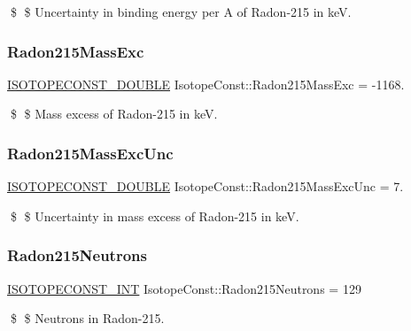 \$ \$ Uncertainty in binding energy per A of Radon-\/215 in keV. \mbox{\label{group___isotope_const-_radon-_rn215_gae24ec0d38185779985fa2596e9b9adc6}} 
\subsubsection{\texorpdfstring{Radon215\+Mass\+Exc}{Radon215MassExc}}
{\footnotesize\ttfamily \mbox{\hyperlink{group___isotope_const-_macros_ga8f45a7272ce02c0b4c65c44636ed719a}{I\+S\+O\+T\+O\+P\+E\+C\+O\+N\+S\+T\+\_\+\+D\+O\+U\+B\+LE}} Isotope\+Const\+::\+Radon215\+Mass\+Exc = -\/1168.}

\$ \$ Mass excess of Radon-\/215 in keV. \mbox{\label{group___isotope_const-_radon-_rn215_ga24fe1ab43dd1a507f48ce3b7e4529c34}} 
\subsubsection{\texorpdfstring{Radon215\+Mass\+Exc\+Unc}{Radon215MassExcUnc}}
{\footnotesize\ttfamily \mbox{\hyperlink{group___isotope_const-_macros_ga8f45a7272ce02c0b4c65c44636ed719a}{I\+S\+O\+T\+O\+P\+E\+C\+O\+N\+S\+T\+\_\+\+D\+O\+U\+B\+LE}} Isotope\+Const\+::\+Radon215\+Mass\+Exc\+Unc = 7.}

\$ \$ Uncertainty in mass excess of Radon-\/215 in keV. \mbox{\label{group___isotope_const-_radon-_rn215_gaa8ce94260b4d9b8a400e38446d444e55}} 
\subsubsection{\texorpdfstring{Radon215\+Neutrons}{Radon215Neutrons}}
{\footnotesize\ttfamily \mbox{\hyperlink{group___isotope_const-_macros_ga5f18360b3e99483a35c32d789e62621c}{I\+S\+O\+T\+O\+P\+E\+C\+O\+N\+S\+T\+\_\+\+I\+NT}} Isotope\+Const\+::\+Radon215\+Neutrons = 129}

\$ \$ Neutrons in Radon-\/215. \mbox{\label{group___isotope_const-_radon-_rn215_ga291b0334e7613b8981a022f36548bb44}} 
